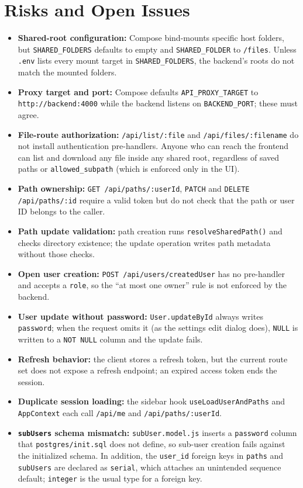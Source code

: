 \documentclass[10pt]{article}
\begin{document}
\section{Risks and Open Issues}
\begin{itemize}
  \setlength\itemsep{2pt}
  \item \textbf{Shared-root configuration:} Compose bind-mounts specific host folders, but
  \texttt{SHARED\_FOLDERS} defaults to empty and \texttt{SHARED\_FOLDER} to \texttt{/files}. Unless
  \texttt{.env} lists every mount target in \texttt{SHARED\_FOLDERS}, the backend's roots do not
  match the mounted folders.
  \item \textbf{Proxy target and port:} Compose defaults \texttt{API\_PROXY\_TARGET} to
  \texttt{http://backend:4000} while the backend listens on \texttt{BACKEND\_PORT}; these must
  agree.
  \item \textbf{File-route authorization:} \texttt{/api/list/:file} and
  \texttt{/api/files/:filename} do not install authentication pre-handlers. Anyone who can reach
  the frontend can list and download any file inside any shared root, regardless of saved paths
  or \texttt{allowed\_subpath} (which is enforced only in the UI).
  \item \textbf{Path ownership:} \texttt{GET /api/paths/:userId}, \texttt{PATCH} and
  \texttt{DELETE /api/paths/:id} require a valid token but do not check that the path or user ID
  belongs to the caller.
  \item \textbf{Path update validation:} path creation runs \texttt{resolveSharedPath()} and
  checks directory existence; the update operation writes path metadata without those checks.
  \item \textbf{Open user creation:} \texttt{POST /api/users/createdUser} has no pre-handler and
  accepts a \texttt{role}, so the ``at most one owner'' rule is not enforced by the backend.
  \item \textbf{User update without password:} \texttt{User.updateById} always writes
  \texttt{password}; when the request omits it (as the settings edit dialog does), \texttt{NULL}
  is written to a \texttt{NOT NULL} column and the update fails.
  \item \textbf{Refresh behavior:} the client stores a refresh token, but the current route set
  does not expose a refresh endpoint; an expired access token ends the session.
  \item \textbf{Duplicate session loading:} the sidebar hook \texttt{useLoadUserAndPaths} and
  \texttt{AppContext} each call \texttt{/api/me} and \texttt{/api/paths/:userId}.
  \item \textbf{\texttt{subUsers} schema mismatch:} \texttt{subUser.model.js} inserts a
  \texttt{password} column that \texttt{postgres/init.sql} does not define, so sub-user creation
  fails against the initialized schema. In addition, the \texttt{user\_id} foreign keys in
  \texttt{paths} and \texttt{subUsers} are declared as \texttt{serial}, which attaches an
  unintended sequence default; \texttt{integer} is the usual type for a foreign key.
\end{itemize}
\end{document}
